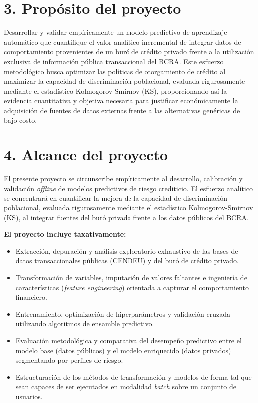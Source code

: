 \documentclass[
11pt, %
codirector, %
]{charter}
\begin{document}
\section{3. Propósito del proyecto}
\label{sec:proposito}

Desarrollar y validar empíricamente un modelo predictivo de aprendizaje automático que cuantifique el valor analítico incremental de integrar datos de comportamiento provenientes de un buró de crédito privado frente a la utilización exclusiva de información pública transaccional del BCRA. Este esfuerzo metodológico busca optimizar las políticas de otorgamiento de crédito al maximizar la capacidad de discriminación poblacional, evaluada rigurosamente mediante el estadístico Kolmogorov-Smirnov (KS), proporcionando así la evidencia cuantitativa y objetiva necesaria para justificar económicamente la adquisición de fuentes de datos externas frente a las alternativas genéricas de bajo costo.

\section{4. Alcance del proyecto}
\label{sec:alcance}

El presente proyecto se circunscribe empíricamente al desarrollo, calibración y validación \textit{offline} de modelos predictivos de riesgo crediticio. El esfuerzo analítico se concentrará en cuantificar la mejora de la capacidad de discriminación poblacional, evaluada rigurosamente mediante el estadístico Kolmogorov-Smirnov (KS), al integrar fuentes del buró privado frente a los datos públicos del BCRA.

\textbf{El proyecto incluye taxativamente:}
\begin{itemize}
\item Extracción, depuración y análisis exploratorio exhaustivo de las bases de datos transaccionales públicas (CENDEU) y del buró de crédito privado.
\item Transformación de variables, imputación de valores faltantes e ingeniería de características (\textit{feature engineering}) orientada a capturar el comportamiento financiero.
\item Entrenamiento, optimización de hiperparámetros y validación cruzada utilizando algoritmos de ensamble predictivo.
\item Evaluación metodológica y comparativa del desempeño predictivo entre el modelo base (datos públicos) y el modelo enriquecido (datos privados) segmentando por perfiles de riesgo.
\item Estructuración de los métodos de transformación y modelos de forma tal que sean capaces de ser ejecutados en modalidad \textit{batch} sobre un conjunto de usuarios.
\end{itemize}
\end{document}
